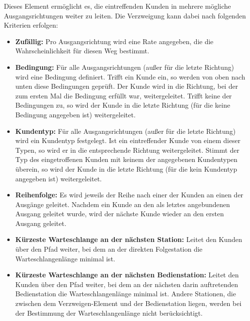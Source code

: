 Dieses Element ermöglicht es, die eintreffenden Kunden in mehrere mögliche Ausgangsrichtungen weiter zu leiten.
Die Verzweigung kann dabei nach folgenden Kriterien erfolgen:

\begin{itemize}
  \item 
    \textbf{Zufällig:}
    Pro Ausgangsrichtung wird eine Rate angegeben, die die Wahrscheinlichkeit für diesen Weg bestimmt.

  \item 
    \textbf{Bedingung:}
    Für alle Ausgangsrichtungen (außer für die letzte Richtung) wird eine Bedingung definiert. Trifft ein
    Kunde ein, so werden von oben nach unten diese Bedingungen geprüft. Der Kunde wird in die Richtung,
    bei der zum ersten Mal die Bedingung erfüllt war, weitergeleitet. Trifft keine der Bedingungen zu,
    so wird der Kunde in die letzte Richtung (für die keine Bedingung angegeben ist) weitergeleitet.    

  \item 
    \textbf{Kundentyp:}
    Für alle Ausgangsrichtungen (außer für die letzte Richtung) wird ein Kundentyp festgelegt. Ist ein
    eintreffender Kunde von einem dieser Typen, so wird er in die entsprechende Richtung weitergeleitet.
    Stimmt der Typ des eingetroffenen Kunden mit keinem der angegebenen Kundentypen überein,
    so wird der Kunde in die letzte Richtung (für die kein Kundentyp angegeben ist) weitergeleitet.

  \item 
    \textbf{Reihenfolge:}
    Es wird jeweils der Reihe nach einer der Kunden an einen der Ausgänge geleitet. Nachdem ein Kunde
    an den als letztes angebundenen Ausgang geleitet wurde, wird der nächste Kunde wieder an den
    ersten Ausgang geleitet. 

  \item 
    \textbf{Kürzeste Warteschlange an der nächsten Station:}
    Leitet den Kunden über den Pfad weiter, bei dem an der direkten Folgestation
    die Warteschlangenlänge minimal ist.

  \item 
    \textbf{Kürzeste Warteschlange an der nächsten Bedienstation:}
    Leitet den Kunden über den Pfad weiter, bei dem an der nächsten
    darin auftretenden Bedienstation die Warteschlangenlänge minimal ist.
    Andere Stationen, die zwischen dem Verzweigen-Element und der
    Bedienstation liegen, werden bei der Bestimmung der Warteschlangenlänge
    nicht berücksichtigt.


\end{itemize}
